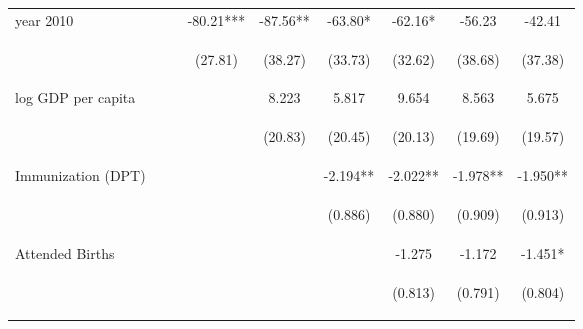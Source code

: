 \begin{landscape}
\begin{table}[htpb!]
\begin{center}
\begin{tabular}{lcccccccc}
year 2010&&&-80.21***&-87.56**&-63.80*&-62.16*&-56.23&-42.41\\
&&&\begin{footnotesize}(27.81)\end{footnotesize}&\begin{footnotesize}(38.27)\end{footnotesize}&\begin{footnotesize}(33.73)\end{footnotesize}&\begin{footnotesize}(32.62)\end{footnotesize}&\begin{footnotesize}(38.68)\end{footnotesize}&\begin{footnotesize}(37.38)\end{footnotesize}\\
log GDP per capita&&&&8.223&5.817&9.654&8.563&5.675\\
&&&&\begin{footnotesize}(20.83)\end{footnotesize}&\begin{footnotesize}(20.45)\end{footnotesize}&\begin{footnotesize}(20.13)\end{footnotesize}&\begin{footnotesize}(19.69)\end{footnotesize}&\begin{footnotesize}(19.57)\end{footnotesize}\\
Immunization (DPT) &&&&&-2.194**&-2.022**&-1.978**&-1.950**\\
&&&&&\begin{footnotesize}(0.886)\end{footnotesize}&\begin{footnotesize}(0.880)\end{footnotesize}&\begin{footnotesize}(0.909)\end{footnotesize}&\begin{footnotesize}(0.913)\end{footnotesize}\\
Attended Births&&&&&&-1.275&-1.172&-1.451*\\
&&&&&&\begin{footnotesize}(0.813)\end{footnotesize}&\begin{footnotesize}(0.791)\end{footnotesize}&\begin{footnotesize}(0.804)\end{footnotesize}\\

\end{tabular}
\end{center}
\end{table}
\end{landscape}
